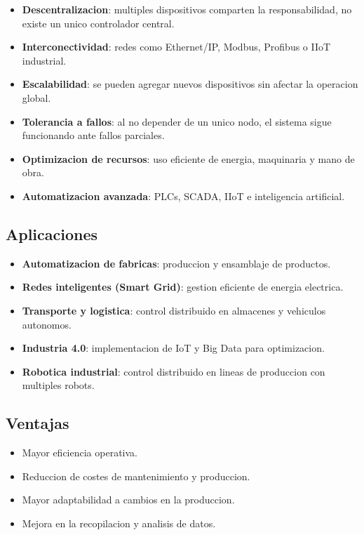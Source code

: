 \begin{itemize}
    \item \textbf{Descentralizacion}: multiples dispositivos comparten la responsabilidad, no existe un unico controlador central.
    \item \textbf{Interconectividad}: redes como Ethernet/IP, Modbus, Profibus o IIoT industrial.
    \item \textbf{Escalabilidad}: se pueden agregar nuevos dispositivos sin afectar la operacion global.
    \item \textbf{Tolerancia a fallos}: al no depender de un unico nodo, el sistema sigue funcionando ante fallos parciales.
    \item \textbf{Optimizacion de recursos}: uso eficiente de energia, maquinaria y mano de obra.
    \item \textbf{Automatizacion avanzada}: PLCs, SCADA, IIoT e inteligencia artificial.
\end{itemize}

\subsection{Aplicaciones}

\begin{itemize}
    \item \textbf{Automatizacion de fabricas}: produccion y ensamblaje de productos.
    \item \textbf{Redes inteligentes (Smart Grid)}: gestion eficiente de energia electrica.
    \item \textbf{Transporte y logistica}: control distribuido en almacenes y vehiculos autonomos.
    \item \textbf{Industria 4.0}: implementacion de IoT y Big Data para optimizacion.
    \item \textbf{Robotica industrial}: control distribuido en lineas de produccion con multiples robots.
\end{itemize}

\subsection{Ventajas}

\begin{itemize}
    \item Mayor eficiencia operativa.
    \item Reduccion de costes de mantenimiento y produccion.
    \item Mayor adaptabilidad a cambios en la produccion.
    \item Mejora en la recopilacion y analisis de datos.
\end{itemize}


